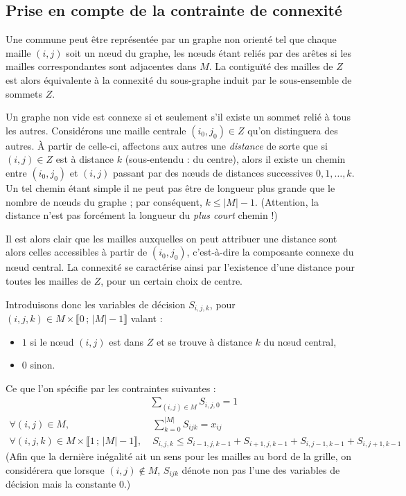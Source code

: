 \documentclass[a4paper,11pt] {article}
\begin{document}
\subsection{Prise en compte de la contrainte de connexité}

Une commune peut être représentée par un graphe non orienté tel que
chaque maille $(i,j)$ soit un nœud du graphe, les nœuds étant reliés
par des arêtes si les mailles correspondantes sont adjacentes dans
$M$. La contiguïté des mailles de $Z$ est alors équivalente à la
connexité du sous-graphe induit par le sous-ensemble de sommets $Z$.

Un graphe non vide est connexe si et seulement s'il existe un sommet
relié à tous les autres. Considérons une maille \og{}centrale\fg{}
$(i_0,j_0) \in Z$ qu'on distinguera des autres. À partir de celle-ci,
affectons aux autres une \textit{distance} de sorte que si
$(i,j) \in Z$ est à distance $k$ (sous-entendu : du centre), alors il
existe un chemin entre $(i_0, j_0)$ et $(i,j)$ passant par des nœuds
de distances successives $0, 1, \ldots, k$. Un tel chemin étant simple
il ne peut pas être de longueur plus grande que le nombre de nœuds du
graphe ; par conséquent, $k \leq |M| - 1$. (Attention, la distance
n'est pas forcément la longueur du \textit{plus court} chemin !)

Il est alors clair que les mailles auxquelles on peut attribuer une
distance sont alors celles accessibles à partir de $(i_0, j_0)$,
c'est-à-dire la composante connexe du nœud central. La connexité se
caractérise ainsi par l'existence d'une distance pour toutes les
mailles de $Z$, pour un certain choix de centre.


Introduisons donc les variables de décision $S_{i,j,k}$, pour
$(i,j,k) \in M \times \llbracket 0 \,;\, |M|-1 \rrbracket$ valant :
\begin{itemize}
\item $1$ si le nœud $(i,j)$ est dans $Z$ et se trouve à distance $k$ du nœud central,
\item $0$ sinon.
\end{itemize}
Ce que l'on spécifie par les contraintes suivantes :
\begin{align*}
  & \sum_{(i,j)\in M} S_{i,j,0} = 1\\
  \forall{(i,j)}\in M, &\; \sum_{k = 0}^{|M|} S_{ijk} = x_{ij}\\
  \forall{(i,j,k)}\in M \times \llbracket 1 \,;\, |M|-1
  \rrbracket,&\; S_{i,j,k} \leq S_{i-1,j,k-1} + S_{i+1,j,k-1} + S_{i,j-1,k-1} + S_{i,j+1,k-1}
\end{align*}
(Afin que la dernière inégalité ait un sens pour les mailles au bord
de la grille, on considérera que lorsque $(i,j) \not\in M$, $S_{ijk}$
dénote non pas l'une des variables de décision mais la constante $0$.)
\end{document}

